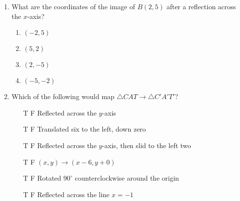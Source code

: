 \begin{enumerate}
\item What are the coordinates of the image of $B(2,5)$ after a reflection across the $x$-axis?  \vspace{0.5cm}
  \begin{multicols}{2}
    \begin{enumerate}
    \item $(-2,5)$
    \item $(5,2)$
    \item $(2,-5)$
    \item $(-5,-2)$
  \end{enumerate}
\end{multicols}

\newpage
\item Which of the following would map $\triangle CAT \rightarrow \triangle C'A'T'$?  \vspace{0.5cm}
  \begin{multicols}{2}
    \begin{itemize}
      \item[T \quad F \quad] Reflected across the $y$-axis
      \item[T \quad F \quad] Translated six to the left, down zero
      \item[T \quad F \quad] Reflected across the $y$-axis, then slid to the left two
      \item[T \quad F \quad] $(x,y) \rightarrow (x-6, y+0)$
      \item[T \quad F \quad] Rotated $90^\circ$ counterclockwise around the origin
      \item[T \quad F \quad] Reflected across the line $x=-1$
    \end{itemize}
\end{multicols}


\end{enumerate}
